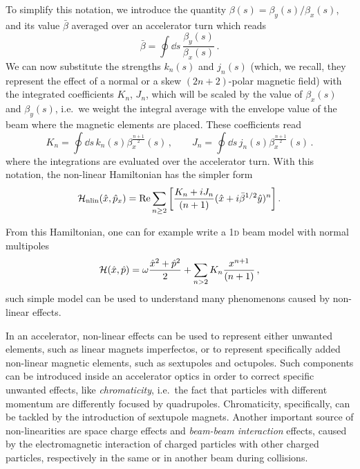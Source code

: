 To simplify this notation, we introduce the quantity $\beta(s)=\beta_y(s)/\beta_x(s)$, and its value $\bar\beta$ averaged over an accelerator turn which reads
\begin{equation}
    \bar\beta = \oint \dd s\, \frac{\beta_y(s)}{\beta_x(s)} \,.
\end{equation}
We can now substitute the strengths $k_n(s)$ and $j_n(s)$ (which, we recall, they represent the effect of a normal or a skew $(2n+2)$-polar magnetic field) with the integrated coefficients $K_n$, $J_n$, which will be scaled by the value of $\beta_x(s)$ and $\beta_y(s)$, i.e.\ we weight the integral average with the envelope value of the beam where the magnetic elements are placed. These coefficients read
%
\begin{equation} 
	K_n = \oint \dd s\, k_n(s) \beta_x^{\frac{n+1}{2}}(s)\,,\qquad
	J_n = \oint \dd s\, j_n(s) \beta_x^{\frac{n+1}{2}}(s)\,.
\end{equation} 
%
where the integrations are evaluated over the accelerator turn. With this notation, the non-linear Hamiltonian has the simpler form
% 
\begin{equation} \mathcal{H}_\text{nlin}(\hat x, \hat p_x) = \Re \sum_{n\ge 2} \qty[\frac{K_n + iJ_n}{(n+1)} (\hat x + i\bar\beta^{1/2} \hat y)^n]\,.\end{equation}

From this Hamiltonian, one can for example write a 1\textsc{d} beam model with normal multipoles
\begin{equation}
	\mathcal{H}(\hat x,\hat p) = \omega \frac{\hat x^2 + \hat p^2}{2} + \sum_{n>2} K_n \frac{x^{n+1}}{(n+1)}\, ,
	\label{eq:hamxp_nl}
\end{equation}
such simple model can be used to understand many phenomenons caused by non-linear effects.

In an accelerator, non-linear effects can be used to represent either unwanted elements, such as linear magnets imperfectos, or to represent specifically added non-linear magnetic elements, such as sextupoles and octupoles. Such components can be introduced inside an accelerator optics in order to correct specific unwanted effects, like \textit{chromaticity}, i.e.\ the fact that particles with different momentum are differently focused by quadrupoles. Chromaticity, specifically, can be tackled by the introduction of sextupole magnets. Another important source of non-linearities are space charge effects and \textit{beam-beam interaction} effects, caused by the electromagnetic interaction of charged particles with other charged particles, respectively in the same or in another beam during collisions.

